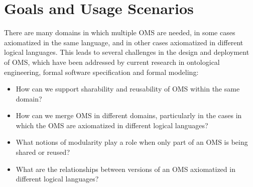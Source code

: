 \documentclass[10pt,%
\ifpretendfinal
final%
\else
draft%
\fi,
]{scrreprt}
\begin{document}
%		
%
%		







\chapter{Goals and Usage Scenarios}

There are many domains in which multiple OMS are needed, in some cases axiomatized in the same 
language, and in other cases axiomatized in different logical languages. This leads to several 
challenges in the design and deployment of OMS, which have been addressed by current research in 
ontological engineering, formal software specification and formal modeling:
\begin{itemize}
\item How can we support sharability and reusability of OMS within the same domain?
\item How can we merge OMS in different domains, particularly in the cases 
in which the OMS are axiomatized in different logical languages?
\item What notions of modularity play a role when only part of an OMS is being shared or reused?
\item What are the relationships between versions of an OMS axiomatized in different logical languages?
\end{itemize}
\end{document}
